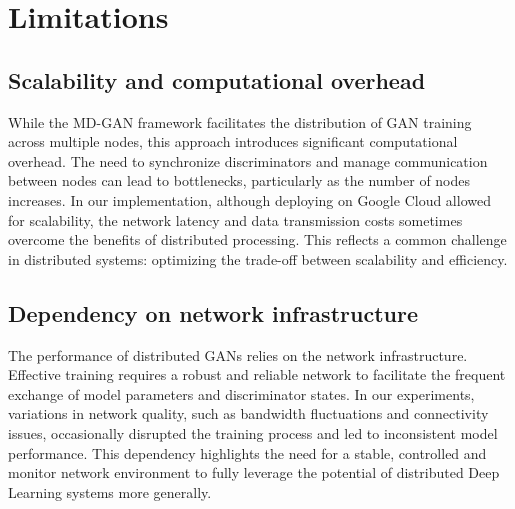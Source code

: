 \chapter{Limitations}

\section{Scalability and computational overhead}
While the MD-GAN framework facilitates the distribution of GAN training across multiple nodes, this approach introduces significant computational overhead. The need to synchronize discriminators and manage communication between nodes can lead to bottlenecks, particularly as the number of nodes increases. In our implementation, although deploying on Google Cloud allowed for scalability, the network latency and data transmission costs sometimes overcome the benefits of distributed processing. This reflects a common challenge in distributed systems: optimizing the trade-off between scalability and efficiency.


\section{Dependency on network infrastructure}
The performance of distributed GANs relies on the network infrastructure. Effective training requires a robust and reliable network to facilitate the frequent exchange of model parameters and discriminator states. In our experiments, variations in network quality, such as bandwidth fluctuations and connectivity issues, occasionally disrupted the training process and led to inconsistent model performance. This dependency highlights the need for a stable, controlled and monitor network environment to fully leverage the potential of distributed Deep Learning systems more generally.


